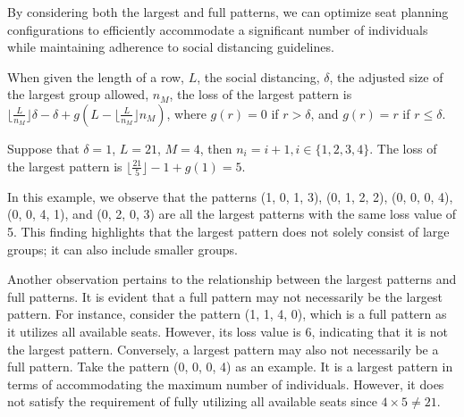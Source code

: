 By considering both the largest and full patterns, we can optimize seat planning configurations to efficiently accommodate a significant number of individuals while maintaining adherence to social distancing guidelines. 


\begin{prop}\label{lem_pattern}
When given the length of a row, $L$, the social distancing, $\delta$, the adjusted size of the largest group allowed, $n_M$, the loss of the largest pattern is $\lfloor \frac{L}{n_M} \rfloor \delta - \delta + g(L - \lfloor \frac{L}{n_M} \rfloor n_M)$, where $g(r) = 0$ if $r > \delta$, and $g(r) = r$ if $r \leq \delta$.
\end{prop}


\begin{example}
Suppose that $\delta =1$, $L = 21$, $M=4$, then $n_i = i +1, i \in \{1,2,3,4\}$. The loss of the largest pattern is $\lfloor \frac{21}{5} \rfloor  - 1 + g(1) = 5$.
\end{example}

In this example, we observe that the patterns (1, 0, 1, 3), (0, 1, 2, 2), (0, 0, 0, 4), (0, 0, 4, 1), and (0, 2, 0, 3) are all the largest patterns with the same loss value of 5. This finding highlights that the largest pattern does not solely consist of large groups; it can also include smaller groups.


Another observation pertains to the relationship between the largest patterns and full patterns. It is evident that a full pattern may not necessarily be the largest pattern. For instance, consider the pattern (1, 1, 4, 0), which is a full pattern as it utilizes all available seats. However, its loss value is 6, indicating that it is not the largest pattern. Conversely, a largest pattern may also not necessarily be a full pattern. Take the pattern (0, 0, 0, 4) as an example. It is a largest pattern in terms of accommodating the maximum number of individuals. However, it does not satisfy the requirement of fully utilizing all available seats since $4 \times 5 \neq 21$.



